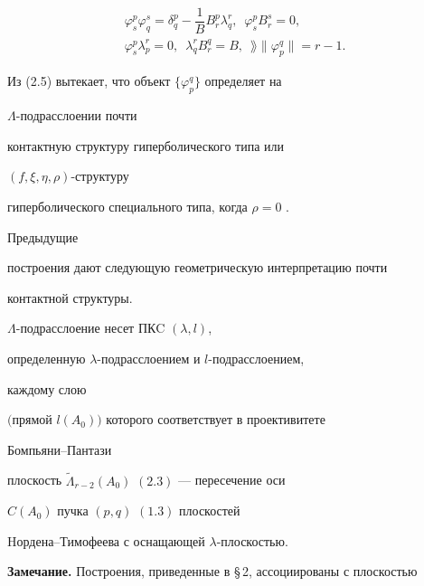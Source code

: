 \begin{equation}


\begin{array}{c}


\varphi^p_s \varphi^s_q = \delta^p_q - \dfrac1B B^p_r \lambda^r_q,\ \;


\varphi^p_s B^s_r = 0, \\[2mm]


\varphi^p_s \lambda^r_p = 0,\ \;


\lambda^r_q B^q_r = B,\ \; \rang\|\varphi^q_p\| = r-1.


\end{array}


\end{equation}


Из (2.5) вытекает, что объект $\{ \varphi^q_p\}$ определяет на


$\Lambda$-подрасслоении почти


контактную структуру гиперболического типа или


$(f, \xi, \eta, \rho)$-структуру


гиперболического специального типа, когда $\rho= 0$ \cite{rab8}.


Предыдущие


построения дают следующую геометрическую интерпретацию почти


контактной структуры.





\begin{thm}


$\Lambda$-подрасслоение несет ПКC $(\lambda, l)$,


определенную $\lambda$-под\-рас\-сло\-е\-нием и $l$-под\-рас\-сло\-е\-нием,


каждому слою


$($прямой $l(A_0))$ которого соответствует в проективитете


Бом\-пья\-ни--Пантази


плоскость ${\widetilde\Lambda}_{r-2}(A_0)$ $(2.3)$ --- пересечение оси


$C(A_0)$ пучка $(p,q)$ $(1.3)$ плоскостей


Hордена--Тимофеева с оснащающей $\lambda$-плоскостью.


\end{thm}





{\bf Замечание.} Построения, приведенные в \S\,2, ассоциированы с плоскостью


